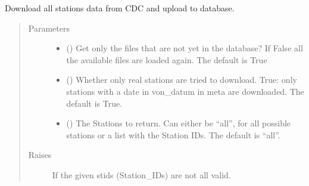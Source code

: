 \documentclass[letterpaper,10pt,english]{sphinxmanual}
\begin{document}
\begin{fulllineitems}
\begin{fulllineitems}
\end{fulllineitems}


\begin{fulllineitems}
\label{\detokenize{weatherDB:weatherDB.stations.StationsBase.update_raw}}
\sphinxAtStartPar
Download all stations data from CDC and upload to database.
\begin{quote}\begin{description}
\item[{Parameters}] \leavevmode\begin{itemize}
\item {} 
\sphinxAtStartPar
{} (\sphinxstyleliteralemphasis{\sphinxupquote{, }}) \textendash{} Get only the files that are not yet in the database?
If False all the available files are loaded again.
The default is True

\item {} 
\sphinxAtStartPar
{} (\sphinxstyleliteralemphasis{\sphinxupquote{, }}) \textendash{} Whether only real stations are tried to download.
True: only stations with a date in von\_datum in meta are downloaded.
The default is True.

\item {} 
\sphinxAtStartPar
{} (\sphinxstyleliteralemphasis{\sphinxupquote{, }}) \textendash{} The Stations to return.
Can either be “all”, for all possible stations
or a list with the Station IDs.
The default is “all”.

\end{itemize}

\item[{Raises}] \leavevmode
\sphinxAtStartPar
{} \textendash{} If the given stids (Station\_IDs) are not all valid.

\end{description}\end{quote}

\end{fulllineitems}


\end{fulllineitems}
\end{document}

